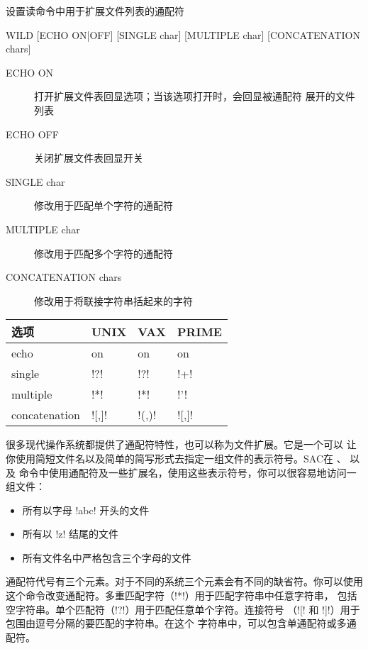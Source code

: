 \label{cmd:wild}

设置读命令中用于扩展文件列表的通配符

\begin{SACSTX}
WILD [ECHO ON|OFF] [SINGLE char] [MULTIPLE char] [CONCATENATION chars]
\end{SACSTX}

\begin{description}
\item [ECHO ON] 打开扩展文件表回显选项；当该选项打开时，会回显被通配符
    展开的文件列表
\item [ECHO OFF] 关闭扩展文件表回显开关
\item [SINGLE char] 修改用于匹配单个字符的通配符
\item [MULTIPLE char] 修改用于匹配多个字符的通配符
\item [CONCATENATION chars] 修改用于将联接字符串括起来的字符
\end{description}

\begin{center}
\begin{tabular}{llll}
\toprule
选项            &   UNIX    &   VAX     &   PRIME   \\
\midrule
echo            &   on      &   on      &   on      \\
single          & !?!& !?!& !+!\\
multiple        & !*!& !*!& !'!\\
concatenation   & ![,]!& !(,)!& ![,]!\\
\bottomrule
\end{tabular}
\end{center}

很多现代操作系统都提供了通配符特性，也可以称为文件扩展。它是一个可以
让你使用简短文件名以及简单的简写形式去指定一组文件的表示符号。SAC在
、 以及 
命令中使用通配符及一些扩展名，使用这些表示符号，你可以很容易地访问一组文件：
\begin{itemize}
\item 所有以字母 !abc! 开头的文件
\item 所有以 !z! 结尾的文件
\item 所有文件名中严格包含三个字母的文件
\end{itemize}

通配符代号有三个元素。对于不同的系统三个元素会有不同的缺省符。你可以使用
这个命令改变通配符。多重匹配字符（!*!）用于匹配字符串中任意字符串，
包括空字符串。单个匹配符（!?!）用于匹配任意单个字符。连接符号
（![! 和 !]!）用于包围由逗号分隔的要匹配的字符串。在这个
字符串中，可以包含单通配符或多通配符。

